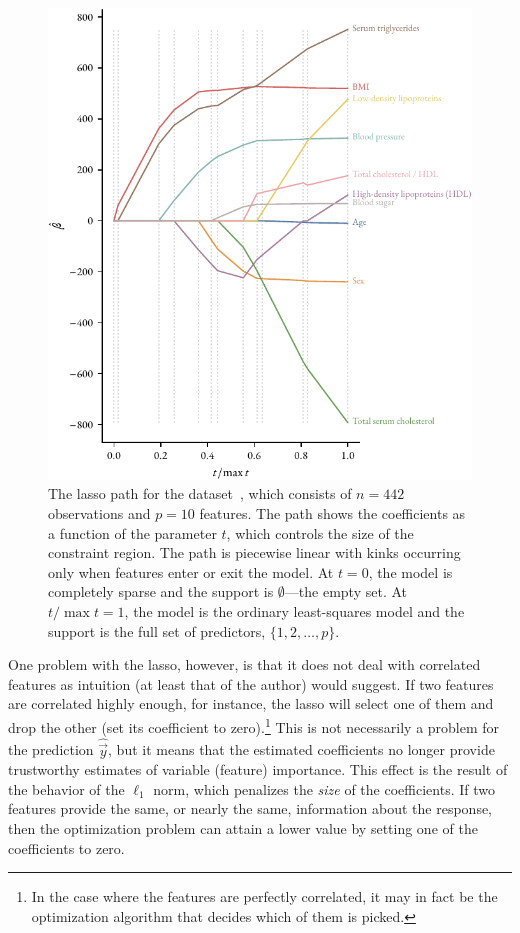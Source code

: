 \begin{figure}
  \centering
  \includegraphics[]{figures/lasso-path.pdf}
  \caption{%
    The lasso path for the  dataset~\parencite{efron2004}, which consists of \(n=442\) observations and \(p=10\) features. The path shows the coefficients as a function of the parameter \(t\), which controls the size of the constraint region. The path is piecewise linear with kinks occurring only when features enter or exit the model.
    At \(t = 0\), the model is completely sparse and the support is \(\emptyset\)---the empty set. At \(t/\max t = 1\), the model is the ordinary least-squares model and the support is the full set of predictors, \(\{1,2,\dots,p\}\).
  }
  \label{fig:lasso-path}
\end{figure}

One problem with the lasso, however, is that it does not deal with correlated features as intuition (at least that of the author) would suggest. If two features are correlated highly enough, for instance, the lasso will select one of them and drop the other (set its coefficient to zero).\footnote{In the case where the features are perfectly correlated, it may in fact be the optimization algorithm that decides which of them is picked.} This is not necessarily a problem for the prediction \(\hat{\vec{y}}\), but it means that the estimated coefficients no longer provide trustworthy estimates of variable (feature) importance. This effect is the result of the behavior of the \(\ell_1\) norm, which penalizes the \emph{size} of the coefficients. If two features provide the same, or nearly the same, information about the response, then the optimization problem can attain a lower value by setting one of the coefficients to zero.


